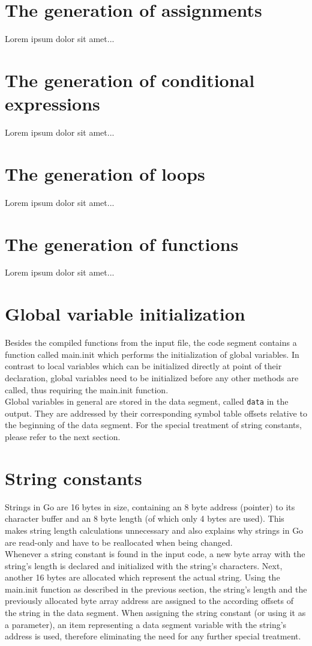 \documentclass[a4paper]{scrreprt}
\begin{document}
    \section{The generation of assignments}
      Lorem ipsum dolor sit amet...

    \section{The generation of conditional expressions}
      Lorem ipsum dolor sit amet...

    \section{The generation of loops}
      Lorem ipsum dolor sit amet...

    \section{The generation of functions} \label{The generation of functions}
      Lorem ipsum dolor sit amet...

    \section{Global variable initialization}
        Besides the compiled functions from the input file, the code segment contains a function called main.init which performs the initialization of global variables. In contrast to local variables which can be initialized directly at point of their declaration, global variables need to be initialized before any other methods are called, thus requiring the main.init function.\\
        Global variables in general are stored in the data segment, called \texttt{data} in the output. They are addressed by their corresponding symbol table offsets relative to the beginning of the data segment. For the special treatment of string constants, please refer to the next section.

    \section{String constants} \label{String constants}
        Strings in Go are 16 bytes in size, containing an 8 byte address (pointer) to its character buffer and an 8 byte length (of which only 4 bytes are used). This makes string length calculations unnecessary and also explains why strings in Go are read-only and have to be reallocated when being changed.\\
        Whenever a string constant is found in the input code, a new byte array with the string's length is declared and initialized with the string's characters. Next, another 16 bytes are allocated which represent the actual string. Using the main.init function as described in the previous section, the string's length and the previously allocated byte array address are assigned to the according offsets of the string in the data segment. When assigning the string constant (or using it as a parameter), an item representing a data segment variable with the string's address is used, therefore eliminating the need for any further special treatment.
\end{document}
